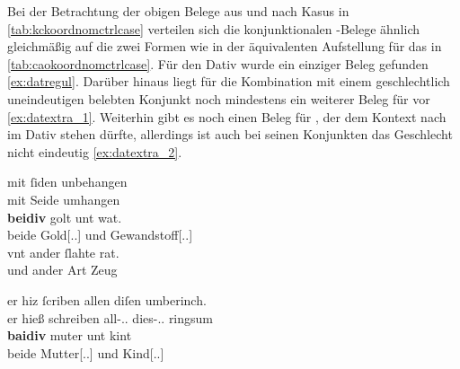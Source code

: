 Bei der Betrachtung der obigen Belege aus \citet{kc:A1} und \citet{kc:VB} nach
Kasus in \cref{tab:kckoordnomctrlcase} verteilen sich die konjunktionalen
-Belege ähnlich gleichmäßig auf die zwei Formen wie in der
äquivalenten Aufstellung für das \CAO{} in
\cref{tab:caokoordnomctrlcase}. Für den Dativ wurde ein einziger Beleg gefunden
\cref{ex:datregul}. Darüber hinaus liegt für die Kombination mit einem
geschlechtlich uneindeutigen belebten Konjunkt noch mindestens ein weiterer
Beleg für  vor \cref{ex:datextra_1}. Weiterhin gibt es noch
einen Beleg für , der dem Kontext nach im Dativ stehen dürfte,
allerdings ist auch bei seinen Konjunkten das Geschlecht nicht eindeutig
\cref{ex:datextra_2}.

\begin{exe}
\ex \label{ex:datregul}
	\gll mit ſiden unbehangen \\
		mit Seide umhangen \\
\sn \gll \textbf{beidiv} golt unt wat. \\
		beide Gold[\Dat.\Sg.\NeutI] und Gewandstoff[\Dat.\Sg.\FemI] \\
\sn \gll vnt ander ſlahte rat. \\
		und ander Art Zeug \\
	\begin{taggedline}{\parencites[7\ra, 23--25]{kc:A1}[1543--1545]{schroeder1895}}
	\trans {}
	\end{taggedline}

\ex \label{ex:datextra}
	\begin{xlist}
	\ex \label{ex:datextra_1}
		\gll er hiz ſcriben allen diſen umberinch. \\
			er hieß schreiben all-\Dat.\Pl.\St{} dies-\Dat.\Pl.\St{} ringsum \\
	\sn \gll \textbf{baidiv} muter unt kint \\
			beide Mutter[\Dat.\Sg.\FemF] und Kind[\Dat.\Sg.\NeutA] \\
		\begin{taggedline}{\parencites[\pno~3\rb, 46--\pno~3\va, 1]{kc:A1}[617--618]{schroeder1895}}
		\trans {}
		\end{taggedline}


\end{xlist}
\end{exe}
